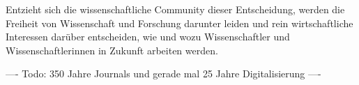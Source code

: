 Entzieht sich die wissenschaftliche Community dieser Entscheidung, werden die Freiheit von Wissenschaft und Forschung darunter leiden und rein wirtschaftliche Interessen darüber entscheiden, wie und wozu Wissenschaftler und Wissenschaftlerinnen in Zukunft arbeiten werden.

---- Todo: 350 Jahre Journals und gerade mal 25 Jahre Digitalisierung ----

